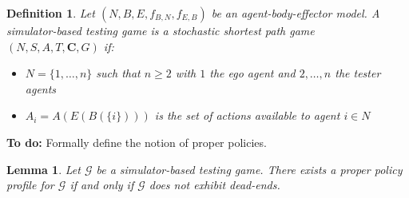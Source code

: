 \documentclass[10pt]{article}
\theoremstyle{plain}
\newtheorem{definition}{Definition}
\newtheorem{lemma}{Lemma}
\newcommand{\vect}[1]{\bm{#1}}
\newenvironment{note}[1][Note]{
    \begin{center}
    	\begin{minipage}{0.9\linewidth}
    		\begin{mdframed}[backgroundcolor=yellow!25,linewidth=0pt]
    			\textbf{#1:} }{
    		\end{mdframed}
    	\end{minipage}
    \end{center}
}
\begin{document}
%

\begin{definition}\label{definition:game}
    Let $(N, B, E, f_{B,N}, f_{E,B})$ be an agent-body-effector model.
    A simulator-based testing game is a stochastic shortest path game $(N, S, A, T, \vect{C}, G)$ if:
    \begin{itemize}
        \item $N = \{ 1, \dots, n \}$ such that $n \ge 2$ with $1$ the ego agent and $2, \dots, n$ the tester agents
        \item $A_{i} = A(E(B(\{ i \})))$ is the set of actions available to agent $i \in N$
    \end{itemize}
\end{definition}

\begin{note}[To do]
    Formally define the notion of proper policies.
\end{note}

\begin{lemma}\label{lemma:dead_ends}
    Let $\mathcal{G}$ be a simulator-based testing game.
    There exists a proper policy profile for $\mathcal{G}$ if and only if $\mathcal{G}$ does not exhibit dead-ends.
\end{lemma}
\end{document}
